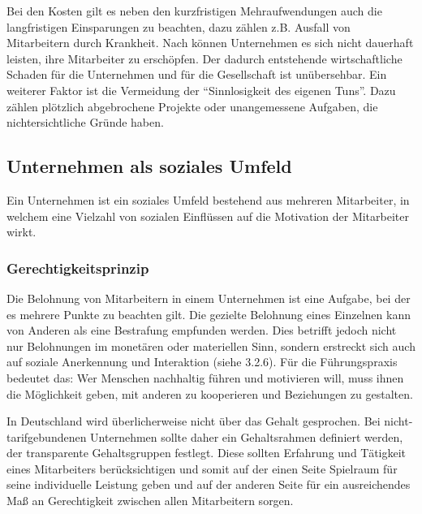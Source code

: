 Bei den Kosten gilt es neben den kurzfristigen Mehraufwendungen auch die langfristigen Einsparungen zu beachten, dazu zählen z.B. Ausfall von Mitarbeitern durch Krankheit. Nach \citet{Schlolaut.2013} können Unternehmen es sich nicht dauerhaft leisten, ihre Mitarbeiter zu erschöpfen. Der dadurch entstehende wirtschaftliche Schaden für die Unternehmen und für die Gesellschaft ist unübersehbar. Ein weiterer Faktor ist die Vermeidung der “Sinnlosigkeit des eigenen Tuns”. Dazu zählen plötzlich abgebrochene Projekte oder unangemessene Aufgaben, die nichtersichtliche Gründe haben.

\subsection{Unternehmen als soziales Umfeld}
Ein Unternehmen ist ein soziales Umfeld bestehend aus mehreren Mitarbeiter, in welchem eine Vielzahl von sozialen Einflüssen auf die Motivation der Mitarbeiter wirkt. 

\subsubsection{Gerechtigkeitsprinzip}
Die Belohnung von Mitarbeitern in einem Unternehmen ist eine Aufgabe, bei der es mehrere Punkte zu beachten gilt. Die gezielte Belohnung eines Einzelnen kann von Anderen als eine Bestrafung empfunden werden. Dies betrifft jedoch nicht nur Belohnungen im monetären oder materiellen Sinn, sondern erstreckt sich auch auf soziale Anerkennung und Interaktion (siehe 3.2.6). \glqq Für die Führungspraxis bedeutet das: Wer Menschen nachhaltig führen und motivieren will, muss ihnen die Möglichkeit geben, mit anderen zu kooperieren und Beziehungen zu gestalten.\grqq \cite[S. 18]{Seelbach.2011} 

In Deutschland wird überlicherweise nicht über das Gehalt gesprochen. Bei nicht-tarifgebundenen Unternehmen sollte daher ein Gehaltsrahmen definiert werden, der transparente Gehaltsgruppen festlegt. Diese sollten Erfahrung und Tätigkeit eines Mitarbeiters berücksichtigen und somit auf der einen Seite Spielraum für seine individuelle Leistung geben und auf der anderen Seite für ein ausreichendes Maß an Gerechtigkeit zwischen allen Mitarbeitern sorgen. 

